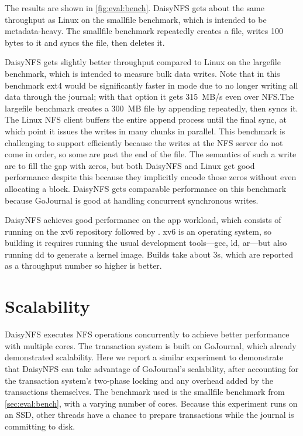 The results are shown in \cref{fig:eval:bench}. DaisyNFS gets about the same
throughput as Linux on the smallfile benchmark, which is intended to
be metadata-heavy. The smallfile benchmark repeatedly creates a file,
writes 100 bytes to it and syncs the file, then deletes it.

DaisyNFS gets slightly better throughput compared to Linux on the largefile benchmark, which is
intended to measure bulk data writes. Note that in this benchmark ext4 would be
significantly faster in  mode due to no longer writing all data
through the journal; with that option it gets 315~MB/s even over
NFS.\@ The largefile benchmark creates a 300~MB file by appending repeatedly, then
syncs it. The Linux NFS client buffers the entire append process until the final
sync, at which point it issues the writes in many chunks in parallel. This
benchmark is challenging to support efficiently because the writes at the NFS
server do not come in order, so some are past the end of the file. The semantics
of such a write are to fill the gap with zeros, but both DaisyNFS and Linux get good
performance despite this because they implicitly encode those zeros without even
allocating a block. DaisyNFS gets comparable performance on this benchmark because
GoJournal is good at handling concurrent synchronous writes.

DaisyNFS achieves good performance on the app workload, which consists of running
 on the xv6 repository followed by . xv6 is an operating
system, so building it requires running the usual development tools---gcc, ld,
ar---but also running dd to generate a kernel image. Builds take about 3s,
which are reported as a throughput number so higher is better.

\section{Scalability}
\label{sec:eval:scale}

DaisyNFS executes NFS operations concurrently to achieve better performance with
multiple cores. The transaction system is built on GoJournal, which already
demonstrated scalability. Here we report a similar experiment to demonstrate
that DaisyNFS can take advantage of GoJournal's scalability, after accounting for
the transaction system's two-phase locking and any overhead added by the
transactions themselves. The benchmark used is the smallfile benchmark from
\cref{sec:eval:bench}, with a varying number of cores. Because this experiment runs
on an SSD, other threads have a chance to prepare transactions while the
journal is committing to disk.

